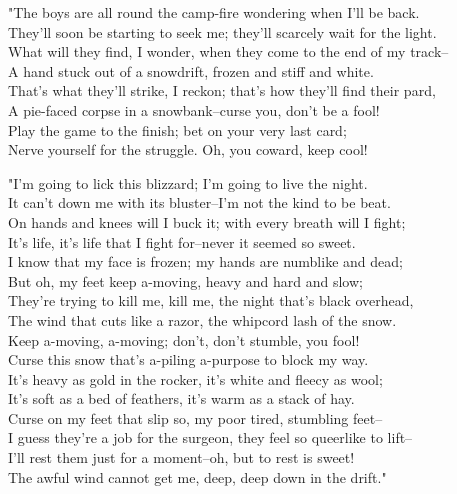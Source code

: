 \begin{poemblock}
"The boys are all round the camp-fire wondering when I'll be back.\\
\idt They'll soon be starting to seek me; they'll scarcely wait for the light.\\
What will they find, I wonder, when they come to the end of my track--\\
\idt A hand stuck out of a snowdrift, frozen and stiff and white.\\
That's what they'll strike, I reckon; that's how they'll find their pard,\\
\idt A pie-faced corpse in a snowbank--curse you, don't be a fool!\\
Play the game to the finish; bet on your very last card;\\
\idt Nerve yourself for the struggle.  Oh, you coward, keep cool!

"I'm going to lick this blizzard; I'm going to live the night.\\
\idt It can't down me with its bluster--I'm not the kind to be beat.\\
On hands and knees will I buck it; with every breath will I fight;\\
\idt It's life, it's life that I fight for--never it seemed so sweet.\\
I know that my face is frozen; my hands are numblike and dead;\\
\idt But oh, my feet keep a-moving, heavy and hard and slow;\\
They're trying to kill me, kill me, the night that's black overhead,\\
\idt The wind that cuts like a razor, the whipcord lash of the snow.\\
Keep a-moving, a-moving; don't, don't stumble, you fool!\\
\idt Curse this snow that's a-piling a-purpose to block my way.\\
It's heavy as gold in the rocker, it's white and fleecy as wool;\\
\idt It's soft as a bed of feathers, it's warm as a stack of hay.\\
Curse on my feet that slip so, my poor tired, stumbling feet--\\
\idt I guess they're a job for the surgeon, they feel so queerlike to lift--\\
I'll rest them just for a moment--oh, but to rest is sweet!\\
\idt The awful wind cannot get me, deep, deep down in the drift."


\end{poemblock}

